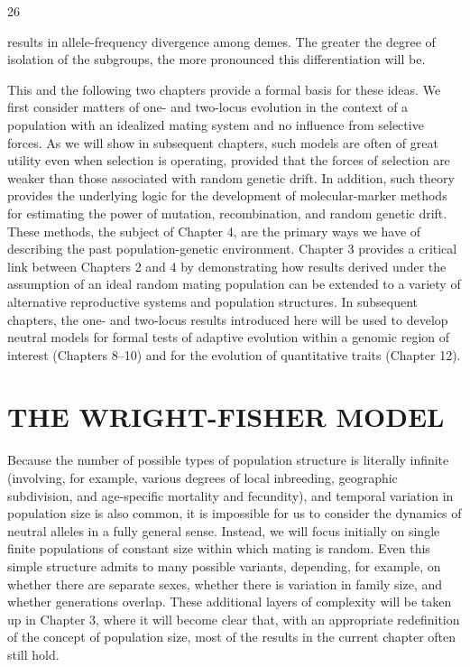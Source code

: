 \documentclass{article}
\begin{document}
26

results in allele-frequency divergence among demes. The greater the degree of isolation of the subgroups, the more pronounced this differentiation will be.

This and the following two chapters provide a formal basis for these ideas. We first consider matters of one- and two-locus evolution in the context of a population with an idealized mating system and no influence from selective forces. As we will show in subsequent chapters, such models are often of great utility even when selection is operating, provided that the forces of selection are weaker than those associated with random genetic drift. In addition, such theory provides the underlying logic for the development of molecular-marker methods for estimating the power of mutation, recombination, and random genetic drift. These methods, the subject of Chapter 4, are the primary ways we have of describing the past population-genetic environment. Chapter 3 provides a critical link between Chapters 2 and 4 by demonstrating how results derived under the assumption of an ideal random mating population can be extended to a variety of alternative reproductive systems and population structures. In subsequent chapters, the one- and two-locus results introduced here will be used to develop neutral models for formal tests of adaptive evolution within a genomic region of interest (Chapters 8–10) and for the evolution of quantitative traits (Chapter 12).

\section{THE WRIGHT-FISHER MODEL}
Because the number of possible types of population structure is literally infinite (involving, for example, various degrees of local inbreeding, geographic subdivision, and age-specific mortality and fecundity), and temporal variation in population size is also common, it is impossible for us to consider the dynamics of neutral alleles in a fully general sense. Instead, we will focus initially on single finite populations of constant size within which mating is random. Even this simple structure admits to many possible variants, depending, for example, on whether there are separate sexes, whether there is variation in family size, and whether generations overlap. These additional layers of complexity will be taken up in Chapter 3, where it will become clear that, with an appropriate redefinition of the concept of population size, most of the results in the current chapter often still hold.
\end{document}

